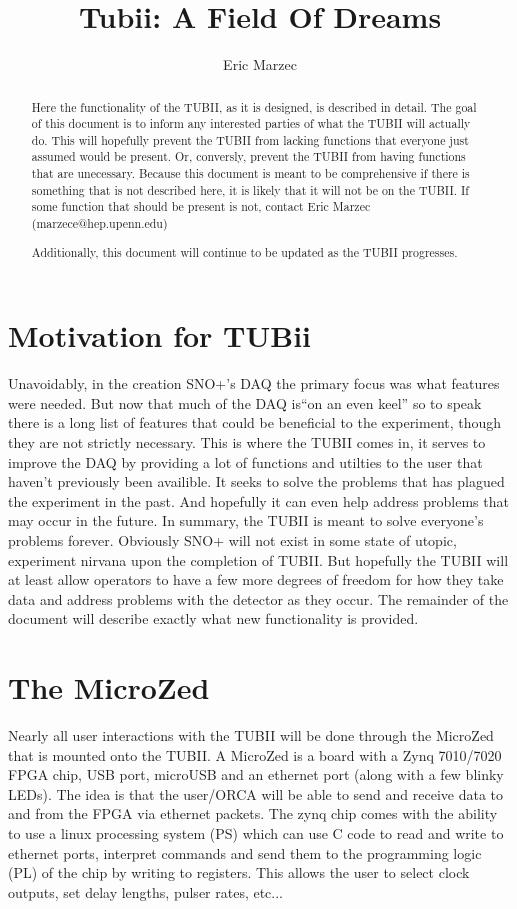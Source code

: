 \documentclass[11pt,a4paper]{article}
\author{Eric Marzec}
\title{Tubii: A Field Of Dreams}
\begin{document}
\maketitle
\begin{abstract}
Here the functionality of the TUBII, as it is designed, is described in detail. The goal of this document is to inform any interested parties of what the TUBII will actually do. This will hopefully prevent the TUBII from lacking functions that everyone just assumed would be present. Or, conversly, prevent the TUBII from having functions that are unecessary. Because this document is meant to be comprehensive if there is something that is not described here, it is likely that it will not be on the TUBII. If some function that should be present is not,  contact Eric Marzec (marzece@hep.upenn.edu)

Additionally, this document will continue to be updated as the TUBII progresses.
\end{abstract}
\section{Motivation for TUBii}
Unavoidably, in the creation SNO+'s DAQ the primary focus was what features were needed. But now that much of the DAQ is``on an even keel'' so to speak there is a long list of features that could be beneficial to the experiment, though they are not strictly necessary. This is where the TUBII comes in, it serves to improve the DAQ by providing a lot of functions and utilties to the user that haven't previously been availible. It seeks to solve the problems that has plagued the experiment in the past. And hopefully it can even help address problems that may occur in the future. In summary, the TUBII is meant to solve everyone's problems forever. Obviously SNO+ will not exist in some state of utopic, experiment nirvana upon the completion of TUBII. But hopefully the TUBII will at least allow operators to have a few more degrees of freedom for how they take data and address problems with the detector as they occur. The remainder of the document will describe exactly what new functionality is provided.

\section{The MicroZed}

Nearly all user interactions with the TUBII will be done through the MicroZed that is mounted onto the TUBII. A MicroZed is a board with a Zynq 7010/7020 FPGA chip, USB port, microUSB and an ethernet port (along with a few blinky LEDs). The idea is that the user/ORCA will be able to send and receive data to and from the FPGA via ethernet packets. The zynq chip comes with the ability to use a linux processing system (PS) which can use C code to read and write to ethernet ports, interpret commands and send them to the programming logic (PL) of the chip by writing to registers. This allows the user to select clock outputs, set delay lengths, pulser rates, etc...
\end{document}
